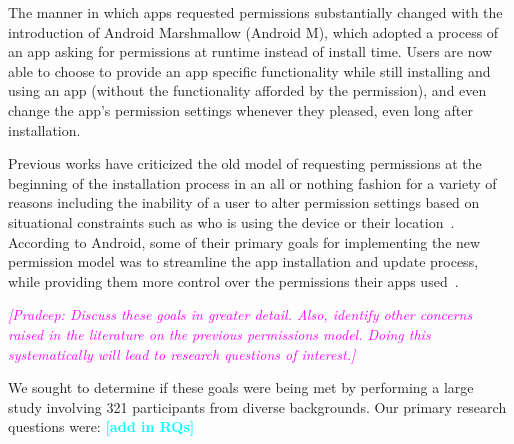 \documentclass{sig-alternate-05-2015}
\newcommand{\todo}[1]{\textcolor{cyan}{\textbf{[#1]}}}
\newcommand{\pkm}[1]{\textcolor{magenta}{{\it [Pradeep: #1]}}}
\begin{document}
The manner in which apps requested permissions substantially changed
with the introduction of Android Marshmallow (Android M), which
adopted a process of an app asking for permissions at runtime instead
of install time. Users are now able to choose to provide an app
specific functionality while still installing and using an app
(without the functionality afforded by the permission), and even
change the app's permission settings whenever they pleased, even long
after installation.














Previous works have criticized the old model of requesting permissions at the beginning of the installation process in an all or nothing fashion for a variety of reasons including the inability of a user to alter permission settings based on situational constraints such as who is using the device or their location~\cite{Nauman:2010:AEA:1755688.1755732,Conti:2010:CCP:1949317.1949355}. According to Android, some of their primary goals for implementing the new permission model was to streamline the app installation and update process, while providing them more control over the permissions their apps used~\cite{android_developer_URL}. %



\pkm{Discuss these goals in greater detail. Also, identify other
concerns raised in the literature on the previous permissions model.
Doing this systematically will lead to research questions of
interest.}


We sought to determine if these goals were being met by performing a
large study involving 321 participants from  diverse backgrounds. Our
primary research questions were: \todo{add in RQs}
\end{document}
